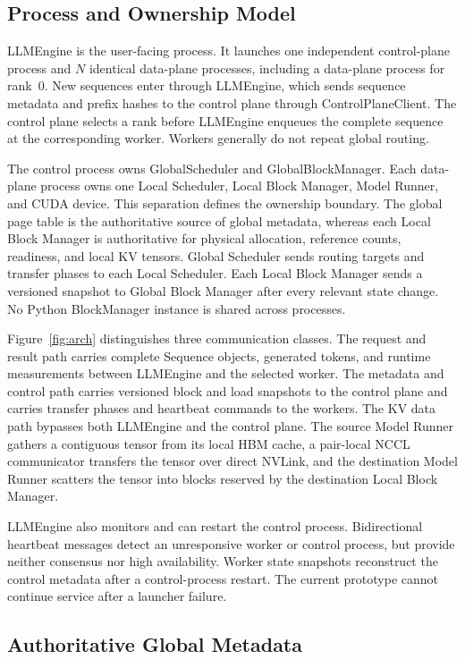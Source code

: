 \documentclass{article}
\begin{document}
\subsection{Process and Ownership Model}

LLMEngine is the user-facing process. It launches one independent control-plane process and $N$ identical data-plane processes, including a data-plane process for rank~0. New sequences enter through LLMEngine, which sends sequence metadata and prefix hashes to the control plane through ControlPlaneClient. The control plane selects a rank before LLMEngine enqueues the complete sequence at the corresponding worker. Workers generally do not repeat global routing.

The control process owns GlobalScheduler and GlobalBlockManager. Each data-plane process owns one Local Scheduler, Local Block Manager, Model Runner, and CUDA device. This separation defines the ownership boundary. The global page table is the authoritative source of global metadata, whereas each Local Block Manager is authoritative for physical allocation, reference counts, readiness, and local KV tensors. Global Scheduler sends routing targets and transfer phases to each Local Scheduler. Each Local Block Manager sends a versioned snapshot to Global Block Manager after every relevant state change. No Python BlockManager instance is shared across processes.

Figure~\ref{fig:arch} distinguishes three communication classes. The request and result path carries complete Sequence objects, generated tokens, and runtime measurements between LLMEngine and the selected worker. The metadata and control path carries versioned block and load snapshots to the control plane and carries transfer phases and heartbeat commands to the workers. The KV data path bypasses both LLMEngine and the control plane. The source Model Runner gathers a contiguous tensor from its local HBM cache, a pair-local NCCL communicator transfers the tensor over direct NVLink, and the destination Model Runner scatters the tensor into blocks reserved by the destination Local Block Manager.

LLMEngine also monitors and can restart the control process. Bidirectional heartbeat messages detect an unresponsive worker or control process, but provide neither consensus nor high availability. Worker state snapshots reconstruct the control metadata after a control-process restart. The current prototype cannot continue service after a launcher failure.

\subsection{Authoritative Global Metadata}
\end{document}

